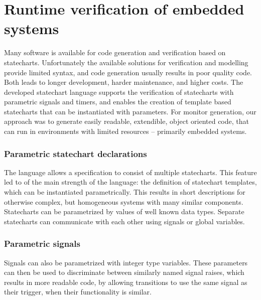 \chapter{Runtime verification of embedded systems}
\label{chap:runtime_verification}
Many software is available for code generation and verification based on statecharts. Unfortunately the available solutions for verification and modelling provide limited syntax, and code generation usually results in poor quality code. Both leads to longer development, harder maintenance, and higher costs. The developed statechart language supports the verification of statecharts with parametric signals and timers, and enables the creation of template based statecharts that can be instantiated with parameters. For monitor generation, our approach was to generate easily readable, extendible, object oriented code, that can run in environments with limited resources -- primarily embedded systems.
  \subsection{Parametric statechart declarations}
The language allows a specification to consist of multiple statecharts. This feature led to of the main strength of the language: the definition of statechart templates, which can be instantiated parametrically. This results in short descriptions for otherwise complex, but homogeneous systems with many similar components. Statecharts can be parametrized by values of well known data types. Separate statecharts can communicate with each other using signals or global variables.
  \subsection{Parametric signals}
Signals can also be parametrized with integer type variables. These parameters can then be used to discriminate between similarly named signal raises, which results in more readable code, by allowing transitions to use the same signal as their trigger, when their functionality is similar.
